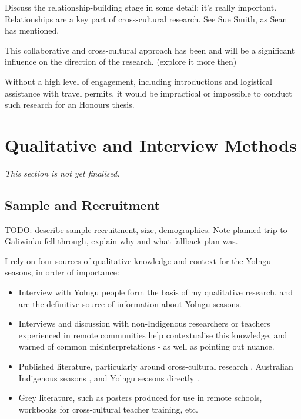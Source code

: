 Discuss the relationship-building stage in some detail; it's really important.
Relationships are a key part of cross-cultural research.  See Sue Smith, as
Sean has mentioned.

This collaborative and cross-cultural approach has been and will be a
significant influence on the direction of the research. (explore it more then)

Without a high level of engagement, including introductions and logistical
assistance with travel permits, it would be impractical or impossible to conduct
such research for an Honours thesis.




\section{Qualitative and Interview Methods}
\textit{This section is not yet finalised.}\\


\subsection{Sample and Recruitment}
TODO: describe sample recruitment, size, demographics.
Note planned trip to Galiwinku fell through, explain why
and what fallback plan was.


I rely on four sources of qualitative knowledge and context for the Yolngu
seasons, in order of importance:

\begin{itemize}
\item Interview with Yolngu people form the basis of my qualitative research, and
        are the definitive source of information about Yolngu seasons.
\item Interviews and discussion with non-Indigenous researchers or teachers experienced
        in remote communities help contextualise this knowledge, and warned of
        common misinterpretations - as well as pointing out nuance.
\item Published literature, particularly around cross-cultural research \citep[eg.][]{smith1999},
        Australian Indigenous seasons \citep[eg.][]{prober2011,oconnor2010}, and Yolngu
        seasons directly \citep{davis1989}.
\item Grey literature, such as posters produced for use in remote schools, workbooks
        for cross-cultural teacher training, etc.
\end{itemize}


